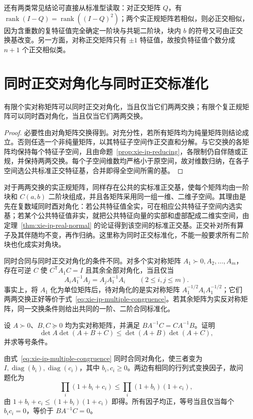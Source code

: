 还有两类常见结论可直接从标准型读取：对正交矩阵 $Q$，有 $\operatorname{rank}(I-Q)=\operatorname{rank}((I-Q)^2)$；两个实正规矩阵若相似，则必正交相似，因为含重数的复特征值完全确定一阶块与共轭二阶块，块内 $b$ 的符号又可由正交换基改变。另一方面，对称正交矩阵只有 $\pm1$ 特征值，故按负特征值个数分成 $n+1$ 个正交相似类。

\section{同时正交对角化与同时正交标准化}
\label{sec:xie-ip-simultaneous-orthogonal}

\begin{theorem}
\label{thm:xie-ip-simultaneous-normal}
有限个实对称矩阵可以同时正交对角化，当且仅当它们两两交换；有限个复正规矩阵可以同时酉对角化，当且仅当它们两两交换。
\end{theorem}
\begin{proof}
必要性由对角矩阵交换得到。对充分性，若所有矩阵均为纯量矩阵则结论成立。否则任选一个非纯量矩阵，以其特征子空间作正交直和分解。与它交换的各矩阵均保持每个特征子空间，且由命题~\ref{prop:xie-ip-reducing}，各限制仍自伴随或正规，并保持两两交换。每个子空间维数均严格小于原空间，故对维数归纳，在各子空间选公共标准正交特征基，合并即得全空间所需的基。
\end{proof}

对于两两交换的实正规矩阵，同样存在公共的实标准正交基，使每个矩阵均由一阶块和 $C(a,b)$ 二阶块组成，并且各矩阵采用同一组一维、二维子空间。其理由是先在复数域同时酉对角化：若公共特征值全实，可在相应公共特征子空间内选实基；若某个公共特征值非实，就把公共特征向量的实部和虚部配成二维实空间，由定理~\ref{thm:xie-ip-real-normal} 的论证得到该空间的标准正交基。正交补对所有算子及其伴随均不变，再作归纳。这里称为同时正交标准化，不能一般要求所有二阶块也化成实对角块。

同时合同与同时正交对角化的条件不同。对多个实对称矩阵 $A_1\succ0,A_2,\ldots,A_m$，存在可逆 $C$ 使 $C^{\mathsf T}A_1C=I$ 且其余全部对角化，当且仅当
\begin{equation}
\label{eq:xie-ip-multiple-congruence}
A_iA_1^{-1}A_j=A_jA_1^{-1}A_i\qquad(2\leq i,j\leq m).
\end{equation}
事实上，将 $A_1$ 化为单位矩阵后，待对角化的是实对称矩阵 $A_1^{-1/2}A_iA_1^{-1/2}$；它们两两交换正好等价于式~\eqref{eq:xie-ip-multiple-congruence}。若其余矩阵为实反对称矩阵，同一交换条件则给出共同的一阶、二阶合同标准化。

\begin{example}
设 $A\succ0$、$B,C\succeq0$ 均为实对称矩阵，并满足 $BA^{-1}C=CA^{-1}B$。证明
\[
\det A\det(A+B+C)\leq\det(A+B)\det(A+C),
\]
并求等号条件。
\end{example}
\begin{solve}
由式~\eqref{eq:xie-ip-multiple-congruence} 同时合同对角化，使三者变为 $I,\operatorname{diag}(b_i),\operatorname{diag}(c_i)$，其中 $b_i,c_i\geq0$。两边有相同的行列式变换因子，故问题化为
\[
\prod_i(1+b_i+c_i)\leq\prod_i(1+b_i)(1+c_i),
\]
由 $1+b_i+c_i\leq(1+b_i)(1+c_i)$ 即得。所有因子均正，等号当且仅当每个 $b_ic_i=0$，等价于 $BA^{-1}C=0$。
\end{solve}

